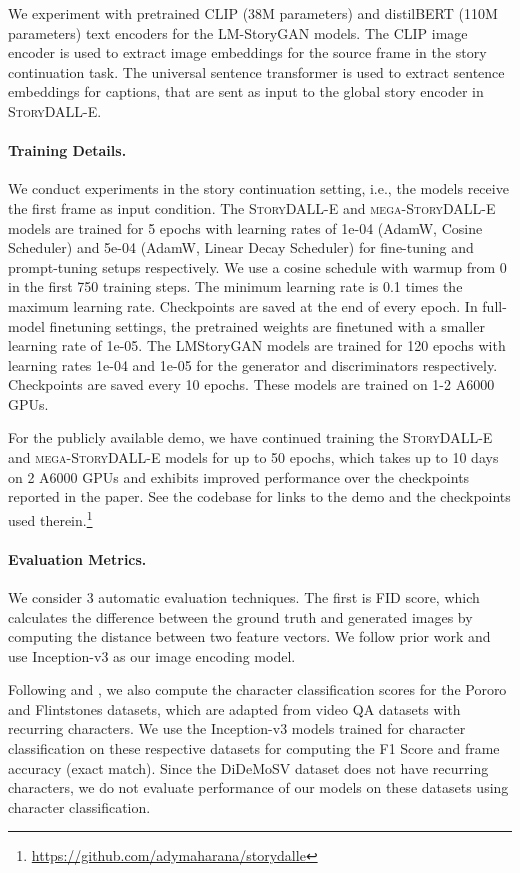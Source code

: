 \documentclass[runningheads]{llncs}
\newcommand{\sdalle}[1]{\textsc{StoryDALL-E}}
\newcommand{\sdallem}[1]{\textsc{mega-StoryDALL-E}}
\begin{document}
We experiment with pretrained CLIP \cite{radford2021learning} (38M parameters) and distilBERT \cite{sanh2019distil} (110M parameters) text encoders for the LM-StoryGAN models. The CLIP image encoder is used to extract image embeddings for the source frame in the story continuation task. The universal sentence transformer \cite{cer2018universal} is used to extract sentence embeddings for captions, that are sent as input to the global story encoder in \sdalle{}.

\paragraph{Training Details.}
We conduct experiments in the story continuation setting, i.e., the models receive the first frame as input condition. The \sdalle{} and \sdallem{} models are trained for 5 epochs with learning rates of 1e-04 (AdamW, Cosine Scheduler) and 5e-04 (AdamW, Linear Decay Scheduler) for fine-tuning and prompt-tuning setups respectively. We use a cosine schedule with warmup from 0 in the first 750 training steps. The minimum learning rate is 0.1 times the maximum learning rate. Checkpoints are saved at the end of every epoch. In full-model finetuning settings, the pretrained weights are finetuned with a smaller learning rate of 1e-05. The LMStoryGAN models are trained for 120 epochs with learning rates 1e-04 and 1e-05 for the generator and discriminators respectively. Checkpoints are saved every 10 epochs. These models are trained on 1-2 A6000 GPUs.

For the publicly available demo, we have continued training the \sdalle{} and \sdallem{} models for up to 50 epochs, which takes up to 10 days on 2 A6000 GPUs and exhibits improved performance over the checkpoints reported in the paper. See the codebase for links to the demo and the checkpoints used therein.\footnote{\url{https://github.com/adymaharana/storydalle}}


\paragraph{Evaluation Metrics.}
We consider 3 automatic evaluation techniques. The first is FID score, which calculates the difference between the ground truth and generated images by computing the distance between two feature vectors. We follow prior work and use Inception-v3 as our image encoding model. 

Following \cite{li2019storygan} and \cite{maharana2021improving}, we also compute the character classification scores for the Pororo and Flintstones datasets, which are adapted from video QA datasets with recurring characters. We use the Inception-v3 models trained for character classification on these respective datasets for computing the F1 Score and frame accuracy (exact match). Since the DiDeMoSV dataset does not have recurring characters, we do not evaluate performance of our models on these datasets using character classification.
\end{document}
